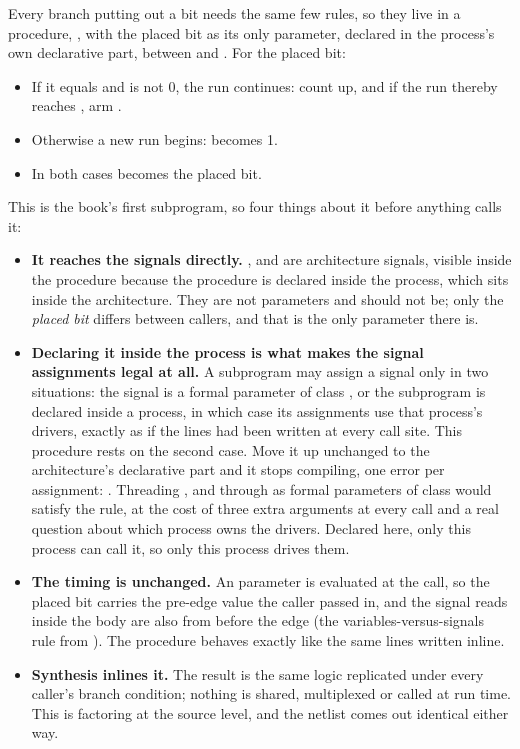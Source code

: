 Every branch putting out a bit needs the same few rules, so they live in a procedure,
, with the placed bit as its only parameter, declared in the process's own declarative
part, between  and . For the placed bit:
\begin{itemize}
  \item If it equals  and  is not 0, the run continues: count
     up, and if the run thereby reaches , arm .
  \item Otherwise a new run begins:  becomes 1.
  \item In both cases  becomes the placed bit.
\end{itemize}

This is the book's first subprogram, so four things about it before anything calls it:
\begin{itemize}
  \item \textbf{It reaches the signals directly.} ,  and
     are architecture signals, visible inside the procedure because the procedure
    is declared inside the process, which sits inside the architecture. They are not parameters and
    should not be; only the \emph{placed bit} differs between callers, and that is the only parameter
    there is.
  \item \textbf{Declaring it inside the process is what makes the signal assignments legal at all.} A
    subprogram may assign a signal only in two situations: the signal is a formal parameter of class
    , or the subprogram is declared inside a process, in which case its assignments use
    that process's drivers, exactly as if the lines had been written at every call site. This
    procedure rests on the second case. Move it up unchanged to the architecture's declarative part
    and it stops compiling, one error per assignment:
    . Threading ,
     and  through as formal parameters of class 
    would satisfy the rule, at the cost of three extra arguments at every call and a real question
    about which process owns the drivers. Declared here, only this process can call it, so only this
    process drives them.
  \item \textbf{The timing is unchanged.} An  parameter is evaluated at the call, so the
    placed bit carries the pre-edge value the caller passed in, and the signal reads inside the body
    are also from before the edge (the variables-versus-signals rule from ). The
    procedure behaves exactly like the same lines written inline.
  \item \textbf{Synthesis inlines it.} The result is the same logic replicated under every caller's
    branch condition; nothing is shared, multiplexed or called at run time. This is factoring at the
    source level, and the netlist comes out identical either way.
\end{itemize}

